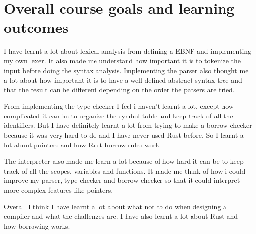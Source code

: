 \documentclass[12pt]{article}
\begin{document}
    \section{Overall course goals and learning outcomes}
	I have learnt a lot about lexical analysis from defining a EBNF and implementing my own lexer.	It also made me understand how important it is to tokenize the input before doing the syntax analysis. Implementing the parser also thought me a lot about how important it is to have a well defined abstract syntax tree and that the result can be different depending on the order the parsers are tried.

	From implementing the type checker I feel i haven't learnt a lot, except how complicated it can be to organize the symbol table and keep track of all the identifiers. But I have definitely learnt a lot from trying to make a borrow checker because it was very hard to do and I have never used Rust before. So I learnt a lot about pointers and how Rust borrow rules work.

	The interpreter also made me learn a lot because of how hard it can be to keep track of all the scopes, variables and functions. It made me think of how i could improve my parser, type checker and borrow checker so that it could interpret more complex features like pointers.

	Overall I think I have learnt a lot about what not to do when designing a compiler and what the challenges are. I have also learnt a lot about Rust and how borrowing works.
\end{document}
